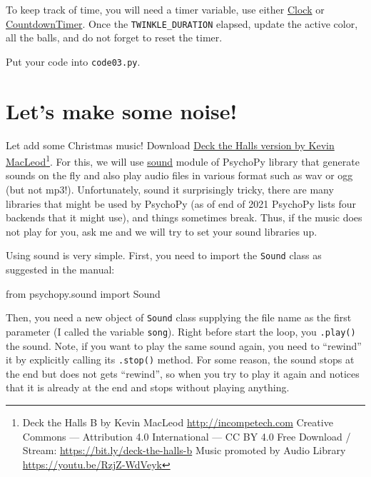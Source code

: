 \documentclass[
]{book}
\newenvironment{Shaded}{\begin{snugshade}}{\end{snugshade}}
\newcommand{\ImportTok}[1]{#1}
\newcommand{\NormalTok}[1]{#1}
\begin{document}
To keep track of time, you will need a timer variable, use either \href{https://psychopy.org/api/clock.html\#psychopy.clock.Clock}{Clock} or \href{https://psychopy.org/api/clock.html\#psychopy.clock.CountdownTimer}{CountdownTimer}. Once the \texttt{TWINKLE\_DURATION} elapsed, update the active color, all the balls, and do not forget to reset the timer.

Put your code into \texttt{code03.py}.

\hypertarget{lets-make-some-noise}{%
\section{Let's make some noise!}\label{lets-make-some-noise}}

Let add some Christmas music! Download \href{material/Deck\%20the\%20Halls\%20B.ogg}{Deck the Halls version by Kevin MacLeod}\footnote{Deck the Halls B by Kevin MacLeod \url{http://incompetech.com}
  Creative Commons --- Attribution 4.0 International --- CC BY 4.0
  Free Download / Stream: \url{https://bit.ly/deck-the-halls-b}
  Music promoted by Audio Library \url{https://youtu.be/RzjZ-WdVeyk}}. For this, we will use \href{https://psychopy.org/api/sound.html}{sound} module of PsychoPy library that generate sounds on the fly and also play audio files in various format such as wav or ogg (but not mp3!). Unfortunately, sound it surprisingly tricky, there are many libraries that might be used by PsychoPy (as of end of 2021 PsychoPy lists four backends that it might use), and things sometimes break. Thus, if the music does not play for you, ask me and we will try to set your sound libraries up.

Using sound is very simple. First, you need to import the \texttt{Sound} class as suggested in the manual:

\begin{Shaded}
\begin{Highlighting}[]
\ImportTok{from}\NormalTok{ psychopy.sound }\ImportTok{import}\NormalTok{ Sound}
\end{Highlighting}
\end{Shaded}

Then, you need a new object of \texttt{Sound} class supplying the file name as the first parameter (I called the variable \texttt{song}). Right before start the loop, you \texttt{.play()} the sound. Note, if you want to play the same sound again, you need to ``rewind'' it by explicitly calling its \texttt{.stop()} method. For some reason, the sound stops at the end but does not gets ``rewind'', so when you try to play it again and notices that it is already at the end and stops without playing anything.
\end{document}

